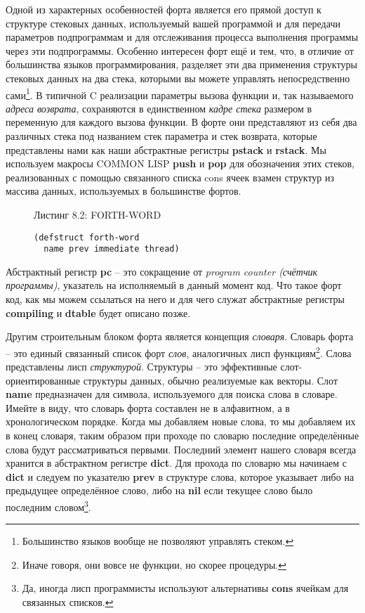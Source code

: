 Одной из характерных особенностей форта является его прямой доступ к структуре стековых данных, используемый вашей программой и для передачи параметров подпрограммам и для отслеживания процесса выполнения программы через эти подпрограммы. Особенно интересен форт ещё и тем, что, в отличие от большинства языков программирования, разделяет эти два применения структуры стековых данных на два стека, которыми вы можете управлять непосредственно сами\footnote{Большинство языков вообще не позволяют управлять стеком.}. В типичной C реализации параметры вызова функции и, так называемого \emph{адреса возврата}, сохраняются в единственном \emph{кадре стека} размером в переменную для каждого вызова функции. В форте они представляют из себя два различных стека под названием стек параметра и стек возврата, которые представлены нами как наши абстрактные регистры \textbf{pstack} и \textbf{rstack}. Мы используем макросы COMMON LISP \textbf{push} и \textbf{pop} для обозначения этих стеков, реализованных с помощью связанного списка cons ячеек взамен структур из массива данных, используемых в большинстве фортов.



\begin{figure}Листинг 8.2: FORTH-WORD\label{listing_8.2}
\listbegin
\begin{verbatim}
(defstruct forth-word
  name prev immediate thread)
\end{verbatim}
\listend
\end{figure}

Абстрактный регистр \textbf{pc} -- это сокращение от \emph{program counter (счётчик программы)}, указатель на исполняемый в данный момент код. Что такое форт код, как мы можем ссылаться на него и для чего служат абстрактные регистры \textbf{compiling} и \textbf{dtable} будет описано позже.

Другим строительным блоком форта является концепция \emph{словаря}. Словарь форта -- это единый связанный список форт \emph{слов}, аналогичных лисп функциям\footnote{Иначе говоря, они вовсе не функции, но скорее процедуры.}. Слова представлены лисп \emph{структурой}. Структуры -- это эффективные слот-ориентированные структуры данных, обычно реализуемые как векторы. Слот \textbf{name} предназначен для символа, используемого для поиска слова в словаре. Имейте в виду, что словарь форта составлен не в алфавитном, а в хронологическом порядке. Когда мы добавляем новые слова, то мы добавляем их в конец словаря, таким образом при проходе по словарю последние определённые слова будут рассматриваться первыми. Последний элемент нашего словаря всегда хранится в абстрактном регистре \textbf{dict}. Для прохода по словарю мы начинаем с \textbf{dict} и следуем по указателю \textbf{prev} в структуре слова, которое указывает либо на предыдущее определённое слово, либо на \textbf{nil} если текущее слово было последним словом\footnote{Да, иногда лисп программисты используют альтернативы \textbf{cons} ячейкам для связанных списков.}.

